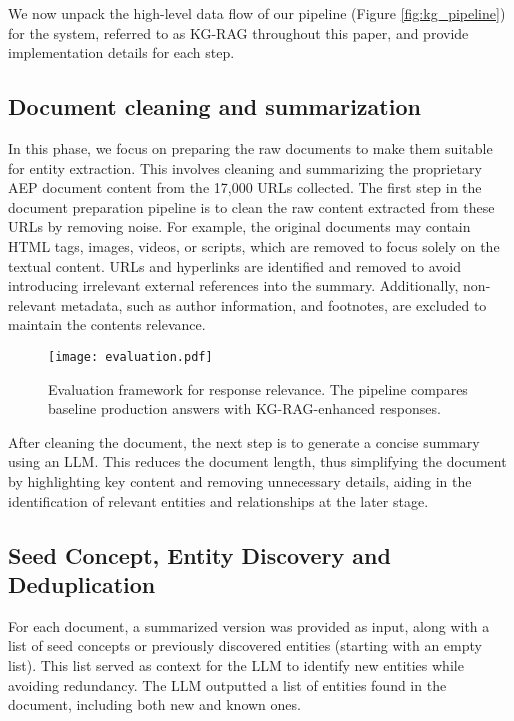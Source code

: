 
We now unpack the high-level data flow of our pipeline (Figure \ref{fig:kg_pipeline}) for the system, referred to as KG-RAG throughout this paper, and provide implementation details for each step.

\subsection{Document cleaning and summarization}
In this phase, we focus on preparing the raw documents to make them suitable for entity extraction. This involves cleaning and summarizing the proprietary AEP document content from the 17,000 URLs collected. The first step in the document preparation pipeline is to clean the raw content extracted from these URLs by removing noise. For example, the original documents may contain HTML tags, images, videos, or scripts, which are removed to focus solely on the textual content. URLs and hyperlinks are identified and removed to avoid introducing irrelevant external references into the summary. Additionally, non-relevant metadata, such as author information, and footnotes, are excluded to maintain the contents relevance.

\begin{figure}[h]
    
    \texttt{[image: evaluation.pdf]} 
    \vspace{-2em}
    \caption{ Evaluation framework for response relevance. The pipeline compares baseline production answers with KG-RAG-enhanced responses.}
    \vspace{-2.0em}
    \label{fig:eval0}
\end{figure}

After cleaning the document, the next step is to generate a concise summary using an LLM. This reduces the document length, thus simplifying the document by highlighting key content and removing unnecessary details, aiding in the identification of relevant entities and relationships at the later stage.


\subsection{Seed Concept, Entity Discovery and Deduplication}

For each document, a summarized version was provided as input, along with a list of seed concepts or previously discovered entities (starting with an empty list). This list served as context for the LLM to identify new entities while avoiding redundancy. The LLM outputted a list of entities found in the document, including both new and known ones. 

